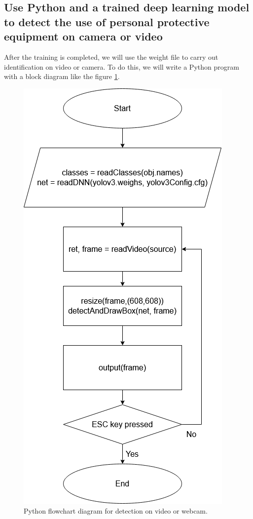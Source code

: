 \documentclass[conference]{IEEEtran}
\begin{document}
\subsection{Use Python and a trained deep learning model to detect the use of personal protective equipment on camera or video}
After the training is completed, we will use the weight file to carry out identification on video or camera. To do this, we will write a Python program with a block diagram like the figure \ref{fig:flow_chart}.
\begin{figure}[ht]
	\centerline{\includegraphics[scale=0.5]{images/flow_chart.png}}
  	\caption{Python flowchart diagram for detection on video or webcam.}
  	\label{fig:flow_chart}
\end{figure}
\end{document}
